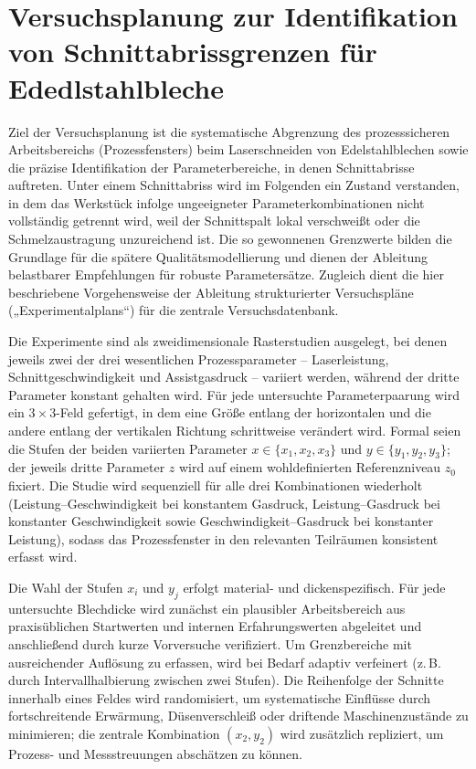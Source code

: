 \chapter{Versuchsplanung zur Identifikation von Schnittabrissgrenzen für Ededlstahlbleche}
Ziel der Versuchsplanung ist die systematische Abgrenzung des prozesssicheren Arbeitsbereichs (Prozessfensters) beim Laserschneiden von Edelstahlblechen sowie die präzise Identifikation der Parameterbereiche, in denen Schnittabrisse auftreten. Unter einem Schnittabriss wird im Folgenden ein Zustand verstanden, in dem das Werkstück infolge ungeeigneter Parameterkombinationen nicht vollständig getrennt wird, weil der Schnittspalt lokal verschweißt oder die Schmelzaustragung unzureichend ist. Die so gewonnenen Grenzwerte bilden die Grundlage für die spätere Qualitätsmodellierung und dienen der Ableitung belastbarer Empfehlungen für robuste Parametersätze. Zugleich dient die hier beschriebene Vorgehensweise der Ableitung strukturierter Versuchspläne („Experimentalplans“) für die zentrale Versuchsdatenbank.

Die Experimente sind als zweidimensionale Rasterstudien ausgelegt, bei denen jeweils zwei der drei wesentlichen Prozessparameter – Laserleistung, Schnittgeschwindigkeit und Assistgasdruck – variiert werden, während der dritte Parameter konstant gehalten wird. Für jede untersuchte Parameterpaarung wird ein $3\times 3$-Feld gefertigt, in dem eine Größe entlang der horizontalen und die andere entlang der vertikalen Richtung schrittweise verändert wird. Formal seien die Stufen der beiden variierten Parameter $x\in\{x_1,x_2,x_3\}$ und $y\in\{y_1,y_2,y_3\}$; der jeweils dritte Parameter $z$ wird auf einem wohldefinierten Referenzniveau $z_0$ fixiert. Die Studie wird sequenziell für alle drei Kombinationen wiederholt (Leistung–Geschwindigkeit bei konstantem Gasdruck, Leistung–Gasdruck bei konstanter Geschwindigkeit sowie Geschwindigkeit–Gasdruck bei konstanter Leistung), sodass das Prozessfenster in den relevanten Teilräumen konsistent erfasst wird.

Die Wahl der Stufen $x_i$ und $y_j$ erfolgt material- und dickenspezifisch. Für jede untersuchte Blechdicke wird zunächst ein plausibler Arbeitsbereich aus praxisüblichen Startwerten und internen Erfahrungswerten abgeleitet und anschließend durch kurze Vorversuche verifiziert. Um Grenzbereiche mit ausreichender Auflösung zu erfassen, wird bei Bedarf adaptiv verfeinert (z.\,B. durch Intervallhalbierung zwischen zwei Stufen). Die Reihenfolge der Schnitte innerhalb eines Feldes wird randomisiert, um systematische Einflüsse durch fortschreitende Erwärmung, Düsenverschleiß oder driftende Maschinenzustände zu minimieren; die zentrale Kombination $(x_2,y_2)$ wird zusätzlich repliziert, um Prozess- und Messstreuungen abschätzen zu können.

